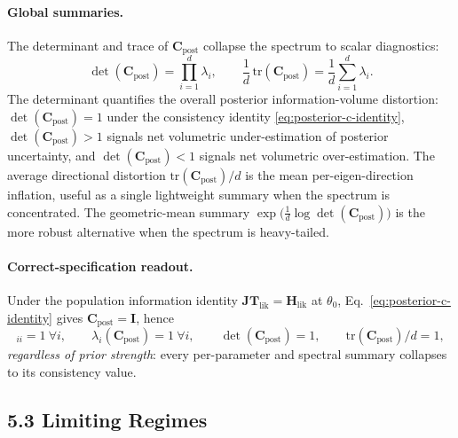 \documentclass[11pt]{article}
\begin{document}
\paragraph{Global summaries.}
The determinant and trace of $\mathbf C_{\mathrm{post}}$ collapse the spectrum to scalar diagnostics:
\begin{equation}
\det(\mathbf C_{\mathrm{post}})
=
\prod_{i=1}^d \lambda_i,
\qquad
\frac{1}{d}\,\mathrm{tr}(\mathbf C_{\mathrm{post}})
=
\frac{1}{d}\sum_{i=1}^d \lambda_i.
\label{eq:posterior-c-global}
\end{equation}
The determinant quantifies the overall posterior information-volume distortion: $\det(\mathbf C_{\mathrm{post}}) = 1$ under the consistency identity \eqref{eq:posterior-c-identity}, $\det(\mathbf C_{\mathrm{post}}) > 1$ signals net volumetric under-estimation of posterior uncertainty, and $\det(\mathbf C_{\mathrm{post}}) < 1$ signals net volumetric over-estimation. The average directional distortion $\mathrm{tr}(\mathbf C_{\mathrm{post}})/d$ is the mean per-eigen-direction inflation, useful as a single lightweight summary when the spectrum is concentrated. The geometric-mean summary $\exp\bigl(\tfrac{1}{d}\log\det(\mathbf C_{\mathrm{post}})\bigr)$ is the more robust alternative when the spectrum is heavy-tailed.

\paragraph{Correct-specification readout.}
Under the population information identity $\mathbf{JT}_{\mathrm{lik}} = \mathbf H_{\mathrm{lik}}$ at $\theta_0$, Eq.~\eqref{eq:posterior-c-identity} gives $\mathbf C_{\mathrm{post}} = \mathbf I$, hence
\begin{equation}
[\mathbf C_{\mathrm{post}}]_{ii} = 1\ \forall i,
\qquad
\lambda_i(\mathbf C_{\mathrm{post}}) = 1\ \forall i,
\qquad
\det(\mathbf C_{\mathrm{post}}) = 1,
\qquad
\mathrm{tr}(\mathbf C_{\mathrm{post}})/d = 1,
\label{eq:posterior-c-correct-spec}
\end{equation}
\emph{regardless of prior strength}: every per-parameter and spectral summary collapses to its consistency value.

\subsection*{5.3 Limiting Regimes}
\end{document}
